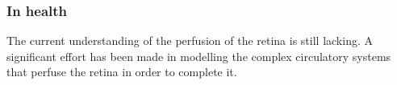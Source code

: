 \documentclass[12pt,a4paper]{journal}
\begin{document}
\subsubsection*{In health}


The current understanding of the perfusion of the retina is still lacking.
A significant effort has been made in modelling the complex circulatory systems that perfuse the retina in order to complete it.
\end{document}
